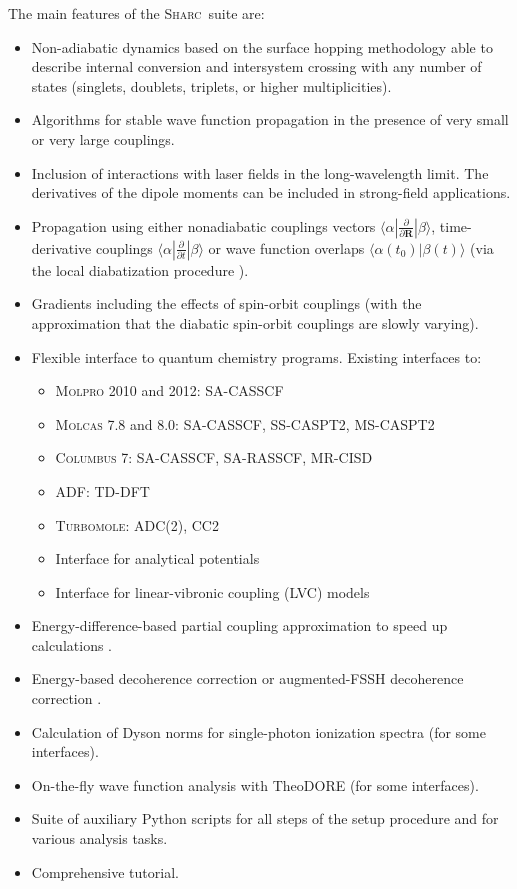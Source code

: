 \documentclass[a4paper,10pt,DIV=15,openany,twoside=false]{scrbook}
\newcommand{\sharc}{\textsc{Sharc}}
\begin{document}
The main features of the \sharc\ suite are:
\begin{itemize}
  \item Non-adiabatic dynamics based on the surface hopping methodology able to describe internal conversion and intersystem crossing with any number of states (singlets, doublets, triplets, or higher multiplicities).
  \item Algorithms for stable wave function propagation in the presence of very small or very large couplings.
  \item Inclusion of interactions with laser fields in the long-wavelength limit. The derivatives of the dipole moments can be included in strong-field applications.
  \item Propagation using either nonadiabatic couplings vectors $\langle\alpha|\frac{\partial}{\partial \mathbf{R}}|\beta\rangle$, time-derivative couplings $\langle\alpha|\frac{\partial}{\partial t}|\beta\rangle$ or wave function overlaps $\langle\alpha(t_0)|\beta(t)\rangle$ (via the local diabatization procedure \cite{Granucci2007JCP}).
  \item Gradients including the effects of spin-orbit couplings (with the approximation that the diabatic spin-orbit couplings are slowly varying).
  \item Flexible interface to quantum chemistry programs. Existing interfaces to:
  \begin{itemize}
    \item \textsc{Molpro} 2010 and 2012: SA-CASSCF
    \item \textsc{Molcas} 7.8 and 8.0: SA-CASSCF, SS-CASPT2, MS-CASPT2%
    \item \textsc{Columbus} 7: SA-CASSCF, SA-RASSCF, MR-CISD
    \item \textsc{ADF}: TD-DFT
    \item \textsc{Turbomole}: ADC(2), CC2
    \item Interface for analytical potentials
    \item Interface for linear-vibronic coupling (LVC) models
  \end{itemize}
  \item Energy-difference-based partial coupling approximation to speed up calculations \cite{Pittner2009CP}.
  \item Energy-based decoherence correction \cite{Granucci2007JCP} or augmented-FSSH decoherence correction \cite{Subotnik_todo}.
  \item Calculation of Dyson norms for single-photon ionization spectra (for some interfaces).
  \item On-the-fly wave function analysis with TheoDORE\cite{theodore_todo} (for some interfaces).
  \item Suite of auxiliary Python scripts for all steps of the setup procedure and for various analysis tasks.
  \item Comprehensive tutorial.
\end{itemize}
\end{document}
